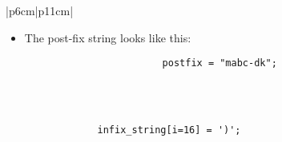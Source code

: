 \begin{center}
\begin{longtable}{ |p{6cm}|p{11cm}| }
\begin{itemize}
{\begin{center}
\begin{tabular}{ c }
                            \texttt{OperandStack =} \\ \\
                        \end{tabular}
                        \begin{bytefield}{10}
                                 \\
                        \end{bytefield}
                    \end{center}
                }
            
            \item The post-fix string looks like this:
                {
                    \begin{verbatim}
                        postfix = "mabc-dk";
                    \end{verbatim}
                }
        \end{itemize}
    \\ 
    \hline
    \hline
     \\
    \hline
    \hline
            {
            \begin{verbatim}
                infix_string[i=16] = ')';
            \end{verbatim}
            }

\end{longtable}
\end{center}
